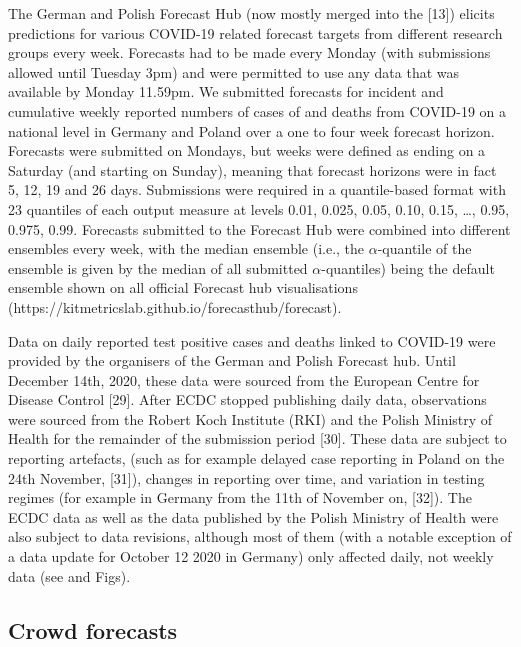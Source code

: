 \documentclass[10pt,letterpaper]{article}
\begin{document}
The German and Polish Forecast Hub (now mostly merged into the {[}13{]})
elicits predictions for various COVID-19 related forecast targets from
different research groups every week. Forecasts had to be made every
Monday (with submissions allowed until Tuesday 3pm) and were permitted
to use any data that was available by Monday 11.59pm. We submitted
forecasts for incident and cumulative weekly reported numbers of cases
of and deaths from COVID-19 on a national level in Germany and Poland
over a one to four week forecast horizon. Forecasts were submitted on
Mondays, but weeks were defined as ending on a Saturday (and starting on
Sunday), meaning that forecast horizons were in fact 5, 12, 19 and 26
days. Submissions were required in a quantile-based format with 23
quantiles of each output measure at levels 0.01, 0.025, 0.05, 0.10,
0.15, \ldots, 0.95, 0.975, 0.99. Forecasts submitted to the Forecast Hub
were combined into different ensembles every week, with the median
ensemble (i.e., the \(\alpha\)-quantile of the ensemble is given by the
median of all submitted \(\alpha\)-quantiles) being the default ensemble
shown on all official Forecast hub visualisations
(https://kitmetricslab.github.io/forecasthub/forecast).

Data on daily reported test positive cases and deaths linked to COVID-19
were provided by the organisers of the German and Polish Forecast hub.
Until December 14th, 2020, these data were sourced from the European
Centre for Disease Control {[}29{]}. After ECDC stopped publishing daily
data, observations were sourced from the Robert Koch Institute (RKI) and
the Polish Ministry of Health for the remainder of the submission period
{[}30{]}. These data are subject to reporting artefacts, (such as for
example delayed case reporting in Poland on the 24th November,
{[}31{]}), changes in reporting over time, and variation in testing
regimes (for example in Germany from the 11th of November on, {[}32{]}).
The ECDC data as well as the data published by the Polish Ministry of
Health were also subject to data revisions, although most of them (with
a notable exception of a data update for October 12 2020 in Germany)
only affected daily, not weekly data (see
 and 
Figs).

\hypertarget{crowd-forecasts}{%
\subsection{Crowd forecasts}\label{crowd-forecasts}}
\end{document}
